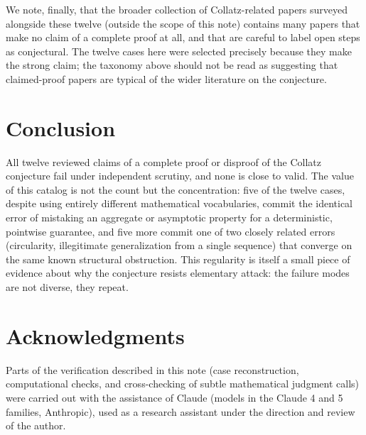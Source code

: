 \documentclass[11pt]{article}
\begin{document}
We note, finally, that the broader collection of Collatz-related papers
surveyed alongside these twelve (outside the scope of this note)
contains many papers that make no claim of a complete proof at all, and
that are careful to label open steps as conjectural. The twelve cases
here were selected precisely because they make the strong claim; the
taxonomy above should not be read as suggesting that claimed-proof
papers are typical of the wider literature on the conjecture.

\section{Conclusion}
\label{sec:conclusion}

All twelve reviewed claims of a complete proof or disproof of the
Collatz conjecture fail under independent scrutiny, and none is close
to valid. The value of this catalog is not the count but the
concentration: five of the twelve cases, despite using entirely
different mathematical vocabularies, commit the identical error of
mistaking an aggregate or asymptotic property for a deterministic,
pointwise guarantee, and five more commit one of two closely related
errors (circularity, illegitimate generalization from a single
sequence) that converge on the same known structural obstruction. This
regularity is itself a small piece of evidence about why the conjecture
resists elementary attack: the failure modes are not diverse, they
repeat.

\section*{Acknowledgments}

Parts of the verification described in this note (case reconstruction,
computational checks, and cross-checking of subtle mathematical
judgment calls) were carried out with the assistance of Claude (models
in the Claude 4 and 5 families, Anthropic), used as a research
assistant under the direction and review of the author.
\end{document}
